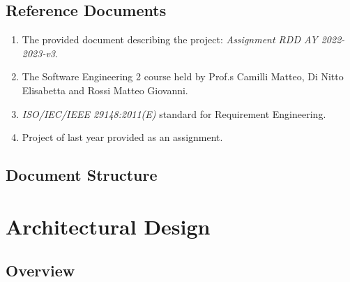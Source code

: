 \documentclass[11pt]{article}
\begin{document}
\subsection{Reference Documents}

\begin{enumerate}
    \item The provided document describing the project: \textit{Assignment RDD AY 2022-2023-v3}.
    \item The Software Engineering 2 course held by Prof.s Camilli Matteo, Di Nitto Elisabetta and Rossi Matteo Giovanni.
    \item \textit{ISO/IEC/IEEE 29148:2011(E)} standard for Requirement Engineering.
    \item Project of last year provided as an assignment.
\end{enumerate}

\subsection{Document Structure}

\section{Architectural Design}







\subsection{Overview}
\end{document}
